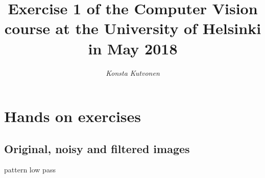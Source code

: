 \documentclass{article}
\begin{document}
\title{Exercise 1 of the Computer Vision course at the
  University of Helsinki in May 2018}

\author{\emph{Konsta Kutvonen}}
\maketitle


\newpage
\section{Hands on exercises}

\subsection{Original, noisy and filtered images}

\newcommand{\aaa}[3]{%
  \fbox{\texttt{[image: \#1]}} \quad
  \fbox{\texttt{[image: \#2]}} \quad
  \fbox{\texttt{[image: \#3]}} \par}

\newcommand{\bbb}[3]{%
  \medskip\noindent\aaa{#1}{#1-#2}{#1-#3}}

\setlength{\fboxsep}{0pt}%

pattern low pass


\end{document}
